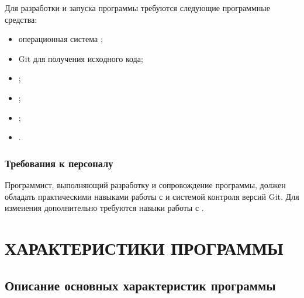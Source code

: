 \documentclass[12pt,a4paper]{extarticle}
\begin{document}
\begin{hseExample}
Для разработки и запуска программы требуются следующие программные средства:

\begin{itemize}[leftmargin=1.25cm]
    \item операционная система ;
    \item Git для получения исходного кода;
    \item {};
    \item {};
    \item {};
    \item {}.
\end{itemize}
\end{hseExample}

\subsubsection{Требования к персоналу}

\begin{hseExample}
Программист, выполняющий разработку и сопровождение программы, должен обладать практическими навыками работы с  и системой контроля версий Git. Для изменения  дополнительно требуются навыки работы с .
\end{hseExample}

\clearpage

\section{ХАРАКТЕРИСТИКИ ПРОГРАММЫ}

\subsection{Описание основных характеристик программы}
\end{document}

